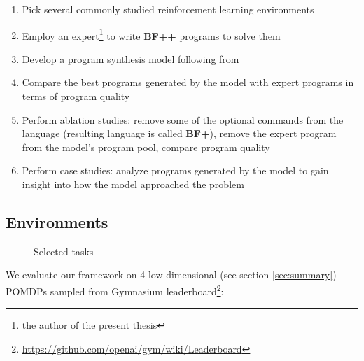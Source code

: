 \begin{enumerate}
    \item Pick several commonly studied reinforcement learning environments
    \item Employ an expert\footnote{the author of the present thesis} to write \textbf{BF++} programs to solve them
    \item Develop a program synthesis model following from \cite{abolafiaNeuralProgramSynthesis2018}
    \item Compare the best programs generated by the model with expert programs in terms of program quality
    \item Perform ablation studies: remove some of the optional commands from the language (resulting language is called \textbf{BF+}), remove the expert program from the model's program pool, compare program quality
    \item Perform case studies: analyze programs generated by the model to gain insight into how the model approached the problem
\end{enumerate}

\subsection{Environments}
\label{sec:envs}

\begin{figure}
    \centering
    \caption{Selected tasks}
    \label{fig:envs}
\end{figure}

We evaluate our framework on 4 low-dimensional (see section \ref{sec:summary}) POMDPs sampled from Gymnasium \cite{towersGymnasiumStandardInterface2024} leaderboard\footnote{\url{https://github.com/openai/gym/wiki/Leaderboard}}:

